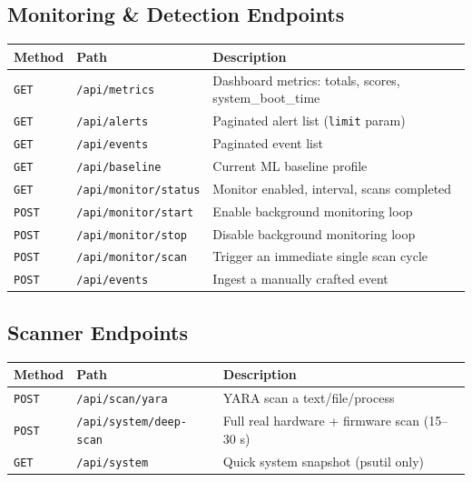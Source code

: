 \documentclass[12pt,a4paper]{article}
\begin{document}
\subsection{Monitoring \& Detection Endpoints}

\begin{table}[H]
\centering
\begin{tabularx}{\linewidth}{llX}
\toprule
\textbf{Method} & \textbf{Path} & \textbf{Description} \\
\midrule
\texttt{GET}  & \texttt{/api/metrics} & Dashboard metrics: totals, scores, system\_boot\_time \\
\texttt{GET}  & \texttt{/api/alerts}  & Paginated alert list (\texttt{limit} param) \\
\texttt{GET}  & \texttt{/api/events}  & Paginated event list \\
\texttt{GET}  & \texttt{/api/baseline} & Current ML baseline profile \\
\texttt{GET}  & \texttt{/api/monitor/status} & Monitor enabled, interval, scans completed \\
\texttt{POST} & \texttt{/api/monitor/start}  & Enable background monitoring loop \\
\texttt{POST} & \texttt{/api/monitor/stop}   & Disable background monitoring loop \\
\texttt{POST} & \texttt{/api/monitor/scan}   & Trigger an immediate single scan cycle \\
\texttt{POST} & \texttt{/api/events}         & Ingest a manually crafted event \\
\bottomrule
\end{tabularx}
\end{table}

\subsection{Scanner Endpoints}

\begin{table}[H]
\centering
\begin{tabularx}{\linewidth}{llX}
\toprule
\textbf{Method} & \textbf{Path} & \textbf{Description} \\
\midrule
\texttt{POST} & \texttt{/api/scan/yara}         & YARA scan a text/file/process \\
\texttt{POST} & \texttt{/api/system/deep-scan}  & Full real hardware + firmware scan (15–30 s) \\
\texttt{GET}  & \texttt{/api/system}            & Quick system snapshot (psutil only) \\
\bottomrule
\end{tabularx}
\end{table}
\end{document}
